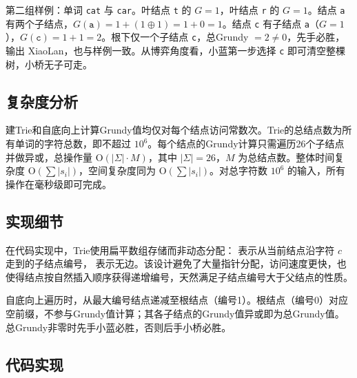 第二组样例：单词 \texttt{cat} 与 \texttt{car}。叶结点 \texttt{t} 的 $G = 1$，叶结点 \texttt{r} 的 $G = 1$。结点 \texttt{a} 有两个子结点，$G(\texttt{a}) = 1 + (1 \oplus 1) = 1 + 0 = 1$。结点 \texttt{c} 有子结点 \texttt{a}（$G = 1$），$G(\texttt{c}) = 1 + 1 = 2$。根下仅一个子结点 \texttt{c}，总Grundy $= 2 \ne 0$，先手必胜，输出 XiaoLan，也与样例一致。从博弈角度看，小蓝第一步选择 \texttt{c} 即可清空整棵树，小桥无子可走。

\subsection{复杂度分析}

建Trie和自底向上计算Grundy值均仅对每个结点访问常数次。Trie的总结点数为所有单词的字符总数，即不超过 $10^6$。每个结点的Grundy计算只需遍历26个子结点并做异或，总操作量 $\mathrm{O}(|\Sigma| \cdot M)$，其中 $|\Sigma| = 26$，$M$ 为总结点数。整体时间复杂度 $\mathrm{O}(\sum |s_i|)$，空间复杂度同为 $\mathrm{O}(\sum |s_i|)$。对总字符数 $10^6$ 的输入，所有操作在毫秒级即可完成。

\subsection{实现细节}

在代码实现中，Trie使用扁平数组存储而非动态分配： 表示从当前结点沿字符 $c$ 走到的子结点编号， 表示无边。该设计避免了大量指针分配，访问速度更快，也使得结点按自然插入顺序获得递增编号，天然满足子结点编号大于父结点的性质。

自底向上遍历时，从最大编号结点递减至根结点（编号1）。根结点（编号0）对应空前缀，不参与Grundy值计算；其各子结点的Grundy值异或即为总Grundy值。总Grundy非零时先手小蓝必胜，否则后手小桥必胜。

\subsection{代码实现}
\inputminted{c++}{../src/p08_magic_prefix.cpp}
